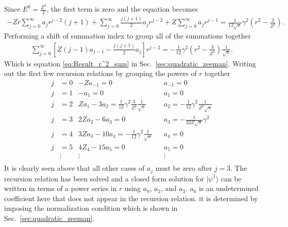     \noindent Since $E^0 = \frac{Z^2}{2}$, the first term is zero and the equation becomes 
    \begin{align*}
        -Zr \sum_{j = 0}^\infty a_j r^{j - 2} (j + 1) + \sum_{j = 0}^\infty \frac{j(j+1)}{2} a_j r^{j - 2} + Z \sum_{j = 0}^\infty a_j r^{j-1} = \frac{1}{12\sqrt{\pi}} \gamma^2 \left(r^2 - \frac{3}{Z^2} \right).
    \end{align*}
    \noindent Performing a shift of summation index to group all of the summations together 
    \begin{align}
        \sum_{j = 0}^\infty \left[ Z(j-1) a_{j-1} - \frac{j(j+1)}{2} a_j \right] r^{j-2} = -\frac{1}{12} \gamma^2 \left(r^2 - \frac{3}{Z^2} \right) \frac{1}{\sqrt{\pi}}.
    \end{align}
    \noindent Which is equation \eqref{eq:Result_r^2_sum} in Sec.~\ref{sec:quadratic_zeeman}. Writing out the first few recursion relations by grouping the powers of $r$ together 
    \begin{align*}
        j &= 0 & -Za_{-1} = 0& &a_{-1} = 0\\ \nonumber
        j &= 1 & -a_1 = 0& &a_{1} = 0\\ \nonumber
        j &= 2 & Za_1 - 3a_2 = \frac{1}{12} \gamma^2 \frac{3}{Z^2}\frac{1}{\sqrt{\pi}} & &a_2 = -\frac{1}{12} \gamma^2 \frac{1}{Z^2 \sqrt{\pi}}\\ \nonumber
        j &= 3 & 2Za_2 - 6a_3 = 0&& a_3 = -\frac{1}{32Z\sqrt{\pi}} \gamma^2\\ \nonumber
        j &= 4 & 3Za_3 - 10a_4 = -\frac{1}{12} \gamma^2 \frac{1}{\sqrt{\pi}} && a_4 = 0\\ \nonumber
        j &= 5 & 4Z_4 - 15a_5 = 0 && a_5 = 0 \\ \nonumber
        & \vdots & \vdots && \vdots \\
    \end{align*}
    \noindent It is clearly seen above that all other cases of $a_j$ must be zero after $j = 3$. The recursion relation has been solved and a closed form solution for $\vert \psi^1 \rangle$ can be written in terms of a power series in $r$ using $a_0$, $a_2$, and $a_3$. $a_0$ is an undetermined coefficient here that does not appear in the recursion relation. it is determined by imposing the normalization condition which is shown in Sec.~\ref{sec:quadratic_zeeman}.\\


